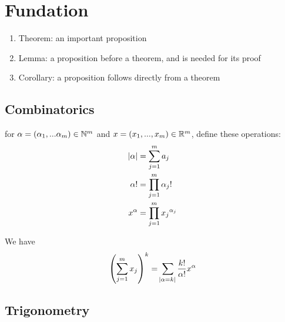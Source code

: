\chapter{Fundation}


\begin{enumerate}
    \item Theorem: an important proposition
    \item Lemma: a proposition before a theorem, and is needed for its proof
    \item Corollary: a proposition follows directly from a theorem
\end{enumerate}

\section{Combinatorics}


\begin{theorem}
    for $\alpha=(\alpha_1, ... \alpha_m) \in \mathbb{N}^m$ and $x=(x_1, ..., x_m) \in \mathbb{R}^m$, define these operations:
    \begin{equation}
        \begin{aligned}
            \abs{\alpha} &= \sum_{j=1}^m a_j \\
            \alpha ! &= \prod_{j=1}^m \alpha_j ! \\
            x^\alpha &= \prod_{j=1}^m {x_j}^{\alpha_j}
        \end{aligned}
    \end{equation}
    
    We have
    \begin{equation}
        \left(\sum_{j=1}^m x_j \right)^k = \sum_{\abs{\alpha = k}} \frac{k!}{\alpha !} x^\alpha
    \end{equation}
\end{theorem}



\section{Trigonometry}

